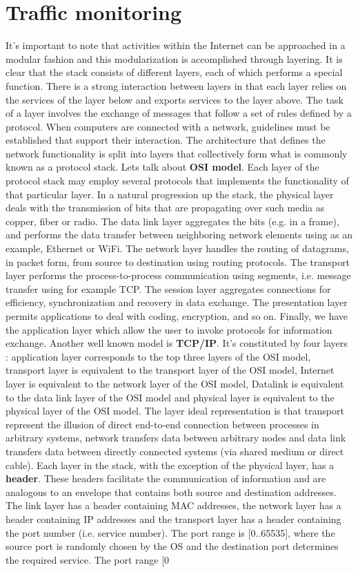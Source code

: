 \documentclass[11pt]{article}
\begin{document}
\section{Traffic monitoring}
It's important to note that activities within the Internet can be approached in a modular fashion and this modularization is accomplished through layering. It is clear that the stack consists of different layers, each of which performs a special function. There is a strong interaction between layers in that each layer relies on the services of the layer below and exports services to the layer above. The task
of a layer involves the exchange of messages that follow a set of rules defined by a protocol. When computers are connected with a network, guidelines must be established that support their interaction. The architecture that defines the network functionality is split into layers that collectively form what is commonly known as a protocol stack. Lets talk about \textbf{OSI model}. Each layer of the protocol stack may employ several protocols that implements the functionality of that particular layer. In a natural progression up the stack, the physical layer deals with the transmission of bits that are propagating over such media as copper, fiber or radio. The data link layer aggregates the bits (e.g. in a frame), and performs the data transfer between neighboring network elements using as an example, Ethernet or WiFi. The network layer handles the routing of datagrams, in packet form, from source to destination using routing protocols. The transport layer performs the process-to-process communication using segments, i.e. message transfer using for example TCP. The session layer aggregates connections for efficiency, synchronization and recovery in data exchange. The presentation layer permits applications to deal with coding, encryption, and so on. Finally, we have the application layer which allow the user to invoke protocols for information exchange. Another well known model is \textbf{TCP/IP}. It's constituted by four layers : application layer  corresponds to the top three layers of the OSI model, transport layer is equivalent to the transport layer of the OSI model, Internet layer is equivalent to the network layer of the OSI model, Datalink is equivalent to the data link layer of the OSI model and physical layer is equivalent to the physical layer of the OSI model. The layer ideal representation is that transport represent the illusion of direct end-to-end connection between processes in arbitrary systems, network transfers data between arbitrary nodes and data link transfers data between directly connected systems (via shared medium or direct cable). Each layer in the stack, with the exception of the physical layer, has a \textbf{header}. These headers facilitate the communication of information and are analogous to an envelope that contains both source and destination addresses. The link layer has a header containing MAC addresses, the network layer has a header containing IP addresses and the transport layer has a header containing the port  number (i.e. service number). The port range is [0..65535], where the source port is randomly chosen by the OS and the destination port determines the required service. The port range [0 
\end{document}
